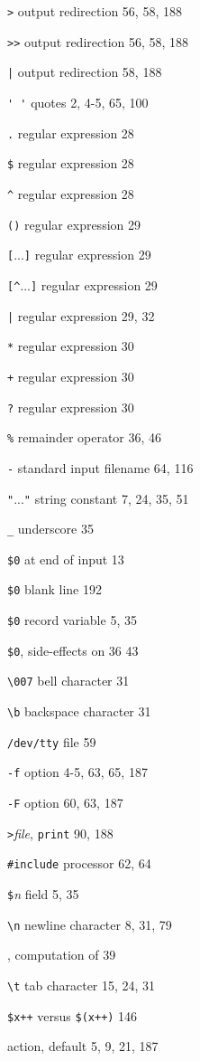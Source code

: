 \begin{multicols}{2}
\verb'>' output redirection 56, 58, 188

\verb'>>' output redirection 56, 58, 188

\verb'|' output redirection 58, 188 

\verb"' '" quotes 2, 4-5, 65, 100

\verb'.' regular expression 28

\verb'$' regular expression 28

\verb'^' regular expression 28

\verb'()' regular expression 29

\verb'['...\verb']' regular expression 29 

\verb'[^'...\verb']' regular expression 29

\verb'|' regular expression 29, 32

\verb'*' regular expression 30

\verb'+' regular expression 30

\verb'?' regular expression 30 

\verb'%' remainder operator 36, 46

\verb'-' standard input filename 64, 116

\verb'"'...\verb'"' string constant 7, 24, 35, 51

\verb'_' underscore 35

\verb'$0' at end of input 13

\verb'$0' blank line 192 

\verb'$0' record variable 5, 35 

\verb'$0', side-effects on 36 43 

\verb'\007' bell character 31 

\verb'\b' backspace character 31 

\verb'/dev/tty' file 59 

\verb'-f' option 4-5, 63, 65, 187 

\verb'-F' option 60, 63, 187 

\verb'>'\textit{file}, \verb'print' 90, 188 

\verb'#include' processor 62, 64 

\verb'$'\textit{n} field 5, 35 

\verb'\n' newline character 8, 31, 79

\pi, computation of 39 

\verb'\t' tab character 15, 24, 31 

\verb'$x++' versus \verb'$(x++)' 146 

action, default 5, 9, 21, 187 


\end{multicols}
